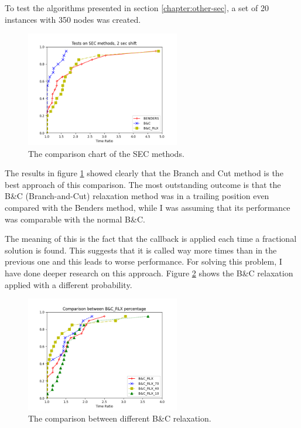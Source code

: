 To test the algorithms presented in section \ref{chapter:other-sec}, a set of 20 instances with 350 nodes was created.

\begin{figure}[h]
	\centering
	\includegraphics[width=0.6\textwidth]{images/final_SEC.png}
	\caption{The comparison chart of the SEC methods.}
	\label{fig:result-sec}
\end{figure}

The results in figure \ref{fig:result-sec} showed clearly that the Branch and Cut method is the best approach of this comparison. The most outstanding outcome is that the B\&C (Branch-and-Cut) relaxation method was in a trailing position even compared with the Benders method, while I was assuming that its performance was comparable with the normal B\&C.

The meaning of this is the fact that the callback is applied each time a fractional solution is found. This suggests that it is called way more times than in the previous one and this leads to worse performance. For solving this problem, I have done deeper research on this approach. Figure \ref{fig:result-bac} shows the B\&C relaxation applied with a different probability.

\begin{figure}[h]
	\centering
	\includegraphics[width=0.6\textwidth]{images/branch_perc.png}
	\caption{The comparison between different B\&C relaxation.}
	\label{fig:result-bac}
\end{figure}

